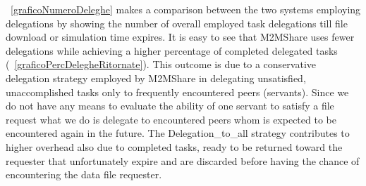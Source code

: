 
\figurename~\ref{graficoNumeroDeleghe} makes a comparison between the two systems employing delegations by showing the number of overall employed task delegations till file download or simulation time expires. It is easy to see that M2MShare uses fewer delegations while achieving a higher percentage of completed delegated tasks (\figurename~\ref{graficoPercDelegheRitornate}). This outcome is due to a conservative delegation strategy employed by M2MShare in delegating unsatisfied, unaccomplished tasks only to frequently encountered peers (servants). Since we do not have any means to evaluate the ability of one servant to satisfy a file request what we do is delegate to encountered peers whom is expected to be encountered again in the future. The Delegation\_to\_all strategy contributes to higher overhead also due to completed tasks, ready to be returned toward the requester that unfortunately expire and are discarded before having the chance of encountering the data file requester. \\


